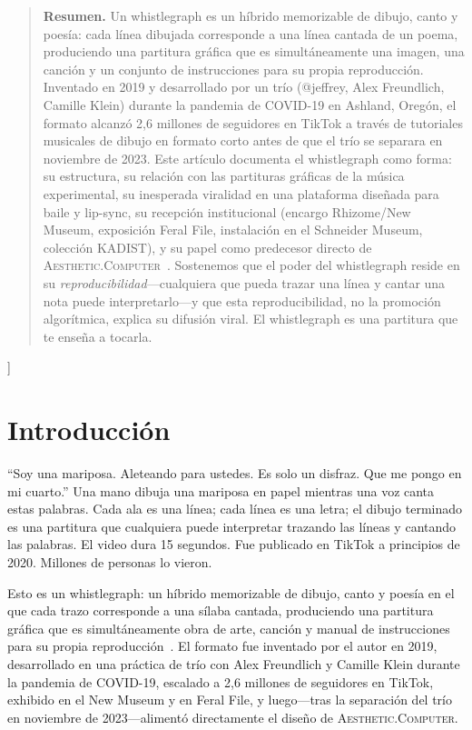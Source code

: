 \documentclass[10pt,letterpaper,twocolumn]{article}
\newcommand{\ac}{\textsc{Aesthetic.Computer}}
\begin{document}
{\begin{quote}
\small\noindent\textbf{Resumen.}
Un whistlegraph es un híbrido memorizable de dibujo, canto y poesía: cada línea dibujada corresponde a una línea cantada de un poema, produciendo una partitura gráfica que es simultáneamente una imagen, una canción y un conjunto de instrucciones para su propia reproducción. Inventado en 2019 y desarrollado por un trío (@jeffrey, Alex Freundlich, Camille Klein) durante la pandemia de COVID-19 en Ashland, Oregón, el formato alcanzó 2,6 millones de seguidores en TikTok a través de tutoriales musicales de dibujo en formato corto antes de que el trío se separara en noviembre de 2023. Este artículo documenta el whistlegraph como forma: su estructura, su relación con las partituras gráficas de la música experimental, su inesperada viralidad en una plataforma diseñada para baile y lip-sync, su recepción institucional (encargo Rhizome/New Museum, exposición Feral File, instalación en el Schneider Museum, colección KADIST), y su papel como predecesor directo de \ac{}~\citep{scudder2026ac}. Sostenemos que el poder del whistlegraph reside en su \emph{reproducibilidad}---cualquiera que pueda trazar una línea y cantar una nota puede interpretarlo---y que esta reproducibilidad, no la promoción algorítmica, explica su difusión viral. El whistlegraph es una partitura que te enseña a tocarla.
\end{quote}
\vspace{0.5em}
}]

\section{Introducción}

``Soy una mariposa. Aleteando para ustedes. Es solo un disfraz. Que me pongo en mi cuarto.'' Una mano dibuja una mariposa en papel mientras una voz canta estas palabras. Cada ala es una línea; cada línea es una letra; el dibujo terminado es una partitura que cualquiera puede interpretar trazando las líneas y cantando las palabras. El video dura 15 segundos. Fue publicado en TikTok a principios de 2020. Millones de personas lo vieron.

Esto es un whistlegraph: un híbrido memorizable de dibujo, canto y poesía en el que cada trazo corresponde a una sílaba cantada, produciendo una partitura gráfica que es simultáneamente obra de arte, canción y manual de instrucciones para su propia reproducción~\citep{dirt2023whistlegraph}. El formato fue inventado por el autor en 2019, desarrollado en una práctica de trío con Alex Freundlich y Camille Klein durante la pandemia de COVID-19, escalado a 2,6 millones de seguidores en TikTok, exhibido en el New Museum y en Feral File, y luego---tras la separación del trío en noviembre de 2023---alimentó directamente el diseño de \ac{}.
\end{document}
